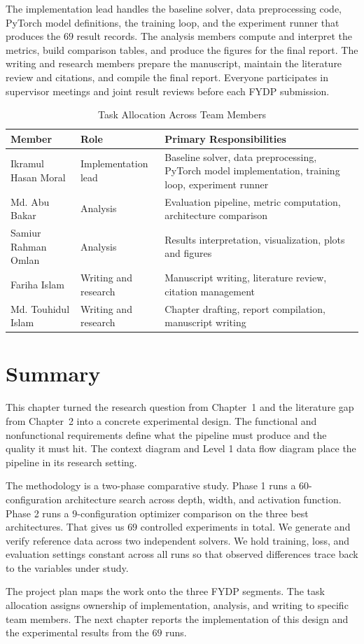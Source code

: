 The implementation lead handles the baseline solver, data preprocessing code, PyTorch model definitions, the training loop, and the experiment runner that produces the $69$ result records. The analysis members compute and interpret the metrics, build comparison tables, and produce the figures for the final report. The writing and research members prepare the manuscript, maintain the literature review and citations, and compile the final report. Everyone participates in supervisor meetings and joint result reviews before each FYDP submission.

\begin{table}[H]
\centering
\caption{Task Allocation Across Team Members}
\label{tab:tasks}
\renewcommand{\arraystretch}{1.2}
\begin{tabular}{|p{4.0cm}|p{3.0cm}|p{6.5cm}|}
\hline
\textbf{Member} & \textbf{Role} & \textbf{Primary Responsibilities} \\
\hline
Ikramul Hasan Moral & Implementation lead & Baseline solver, data preprocessing, PyTorch model implementation, training loop, experiment runner \\
\hline
Md. Abu Bakar & Analysis & Evaluation pipeline, metric computation, architecture comparison \\
\hline
Samiur Rahman Omlan & Analysis & Results interpretation, visualization, plots and figures \\
\hline
Fariha Islam & Writing and research & Manuscript writing, literature review, citation management \\
\hline
Md. Touhidul Islam & Writing and research & Chapter drafting, report compilation, manuscript writing \\
\hline
\end{tabular}
\end{table}

\section{Summary}

This chapter turned the research question from Chapter~1 and the literature gap from Chapter~2 into a concrete experimental design. The functional and nonfunctional requirements define what the pipeline must produce and the quality it must hit. The context diagram and Level 1 data flow diagram place the pipeline in its research setting.

The methodology is a two-phase comparative study. Phase 1 runs a $60$-configuration architecture search across depth, width, and activation function. Phase 2 runs a $9$-configuration optimizer comparison on the three best architectures. That gives us $69$ controlled experiments in total. We generate and verify reference data across two independent solvers. We hold training, loss, and evaluation settings constant across all runs so that observed differences trace back to the variables under study.

The project plan maps the work onto the three FYDP segments. The task allocation assigns ownership of implementation, analysis, and writing to specific team members. The next chapter reports the implementation of this design and the experimental results from the $69$ runs.
